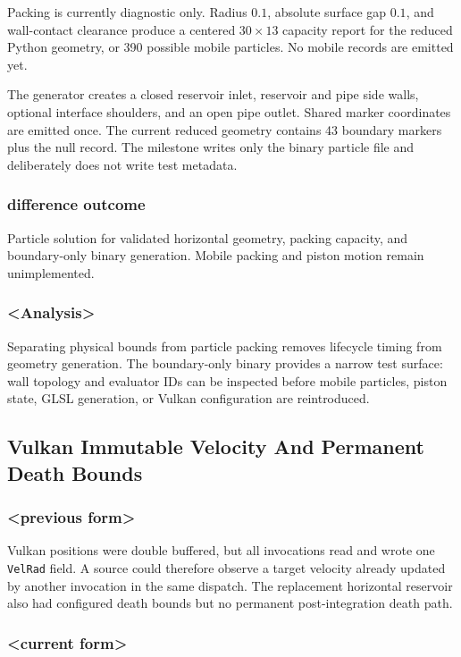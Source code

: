 Packing is currently diagnostic only.  Radius $0.1$, absolute surface gap
$0.1$, and wall-contact clearance produce a centered $30\times13$ capacity
report for the reduced Python geometry, or 390 possible mobile particles.
No mobile records are emitted yet.

The generator creates a closed reservoir inlet, reservoir and pipe side walls,
optional interface shoulders, and an open pipe outlet.  Shared marker
coordinates are emitted once.  The current reduced geometry contains 43
boundary markers plus the null record.  The milestone writes only the binary
particle file and deliberately does not write test metadata.

\subsubsection{difference outcome}

Particle solution for validated horizontal geometry, packing capacity, and
boundary-only binary generation.  Mobile packing and piston motion remain
unimplemented.

\subsubsection{<Analysis>}

Separating physical bounds from particle packing removes lifecycle timing from
geometry generation.  The boundary-only binary provides a narrow test surface:
wall topology and evaluator IDs can be inspected before mobile particles,
piston state, GLSL generation, or Vulkan configuration are reintroduced.

\subsection{Vulkan Immutable Velocity And Permanent Death Bounds}

\subsubsection{<previous form>}

Vulkan positions were double buffered, but all invocations read and wrote one
\texttt{VelRad} field.  A source could therefore observe a target velocity
already updated by another invocation in the same dispatch.  The replacement
horizontal reservoir also had configured death bounds but no permanent
post-integration death path.

\subsubsection{<current form>}

